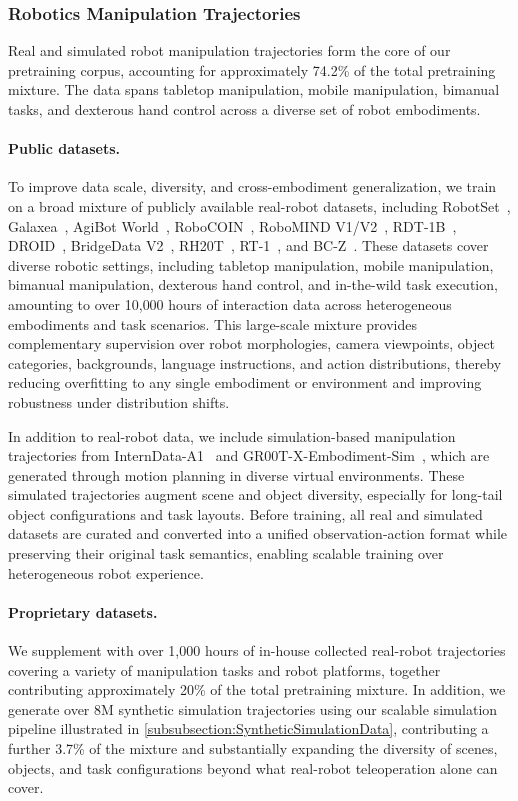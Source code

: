 \subsubsection{Robotics Manipulation Trajectories}

Real and simulated robot manipulation trajectories form the core of our
pretraining corpus, accounting for approximately 74.2\% of the total
pretraining mixture. The data spans tabletop manipulation, mobile manipulation,
bimanual tasks, and dexterous hand control across a diverse set of robot
embodiments.

\paragraph{Public datasets.}

To improve data scale, diversity, and cross-embodiment generalization, we train
on a broad mixture of publicly available real-robot datasets, including
RobotSet~\citep{RoboSet}, Galaxea~\citep{galaxea_g0},
AgiBot World~\citep{agibot_world_colosseo}, RoboCOIN~\citep{robocoin},
RoboMIND V1/V2~\citep{robomind_v1,robomind_v2}, RDT-1B~\citep{RDT-1B},
DROID~\citep{droid}, BridgeData V2~\citep{bridgev2},
RH20T~\citep{RH20T}, RT-1~\citep{rt1}, and BC-Z~\citep{bc_z}.
These datasets cover diverse robotic settings, including tabletop
manipulation, mobile manipulation, bimanual manipulation, dexterous hand
control, and in-the-wild task execution, amounting to over 10{,}000 hours of
interaction data across heterogeneous embodiments and task scenarios. This
large-scale mixture provides complementary supervision over robot morphologies,
camera viewpoints, object categories, backgrounds, language instructions, and
action distributions, thereby reducing overfitting to any single embodiment or
environment and improving robustness under distribution shifts.

In addition to real-robot data, we include simulation-based manipulation
trajectories from InternData-A1~\citep{interndata-a1} and
GR00T-X-Embodiment-Sim~\citep{nvidia2025gr00t}, which are generated through motion
planning in diverse virtual environments. These simulated trajectories augment
scene and object diversity, especially for long-tail object configurations and
task layouts. Before training, all real and simulated datasets are curated and
converted into a unified observation-action format while preserving their
original task semantics, enabling scalable training over heterogeneous robot
experience.
\paragraph{Proprietary datasets.}
We supplement with over 1{,}000 hours of in-house collected real-robot trajectories
covering a variety of manipulation tasks and robot platforms, together
contributing approximately 20\% of the total pretraining mixture.
In addition, we generate over 8M synthetic simulation trajectories using our
scalable simulation pipeline illustrated in \cref{subsubsection:SyntheticSimulationData}, contributing a further 3.7\%
of the mixture and substantially expanding the diversity of scenes, objects,
and task configurations beyond what real-robot teleoperation alone can cover.

